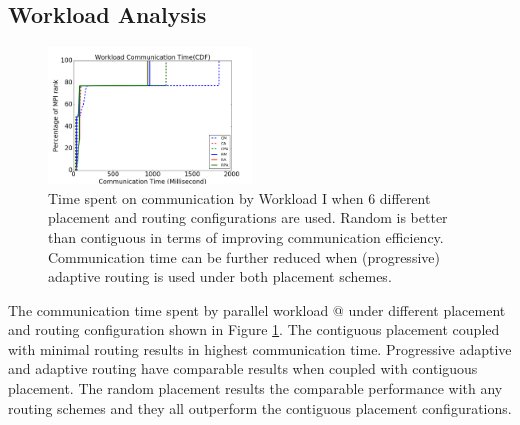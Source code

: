 \documentclass[conference,compsoc]{IEEEtran}
\makeatletter
\newcommand{\Rmnum}[1]{\expandafter\@slowromancap\romannumeral #1@}
\makeatother
\begin{document}
\subsection{Workload Analysis}
\begin{figure}[h!]
  \centering
  \includegraphics[width = 0.48\textwidth ]{wkld/wkld-commtime}
  \caption{Time spent on communication by Workload I when 6 different placement and routing configurations are used. Random is better than contiguous in terms of improving communication efficiency. Communication time can be further reduced when (progressive) adaptive routing is used under both placement schemes. }
  \label{fig:wkld-commtime}
\end{figure}

The communication time spent by parallel workload \Rmnum{1} under different placement and routing configuration shown in Figure \ref{fig:wkld-commtime}. The contiguous placement coupled with minimal routing results in highest communication time. Progressive adaptive and adaptive routing have comparable results when coupled with contiguous placement. The random placement results the comparable performance with any routing schemes and they all outperform the contiguous placement configurations.
\end{document}
